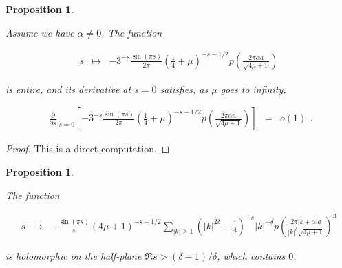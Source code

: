 \documentclass{jams-l}
\newtheorem{proposition}[theorem]{Proposition}
\theoremstyle{definition}
\theoremstyle{remark}
\numberwithin{equation}{section}
\begin{document}
            \begin{proposition}
            \label{PropA6Power1-0}
            
                Assume we have $\alpha \neq 0$. The function
                
                \[ \begin{array}{lll}
                        s & \longmapsto & - 3^{-s} \frac{\sin \left( \pi s \right)}{2 \pi} \left( \frac{1}{4} + \mu \right)^{-s-1/2} p \left( \frac{2 \pi \alpha a}{\sqrt{4 \mu + 1}} \right)
                    \end{array} \]
                
                \noindent is entire, and its derivative at $s=0$ satisfies, as $\mu$ goes to infinity,
                
                \[ \begin{array}{lll}
                        \scriptstyle \frac{\partial}{\partial s}_{\left \vert s = 0 \right.} \left[ - 3^{-s} \frac{\sin \left( \pi s \right)}{2 \pi} \left( \frac{1}{4} + \mu \right)^{-s-1/2} p \left( \frac{2 \pi \alpha a}{\sqrt{4 \mu + 1}} \right) \right] & \scriptstyle = & \scriptstyle o \left( 1 \right)
                    \end{array} . \]
            
            \end{proposition}
            
            \begin{proof}
            
                This is a direct computation.
            
            \end{proof}
            
            \begin{proposition}
            \label{PropA6Power3}
            
                The function
                
                \[ \begin{array}{lll}
                        s & \longmapsto & - \frac{\sin \left( \pi s \right)}{\pi} \left( 4 \mu + 1 \right)^{-s-1/2} \sum\limits_{\left \vert k \right \vert \geqslant 1} \left( \left \vert k \right \vert^{2 \delta} - \frac{1}{4} \right)^{-s} \left \vert k \right \vert^{- \delta} p \left( \frac{2 \pi \left \vert k + \alpha \right \vert a}{\left \vert k \right \vert^{\delta} \sqrt{4 \mu + 1}} \right)^3
                    \end{array} \]
                    
                \noindent is holomorphic on the half-plane $\Re s > \left( \delta - 1 \right) / \delta$, which contains $0$.
            
            \end{proposition}
            
\end{document}
